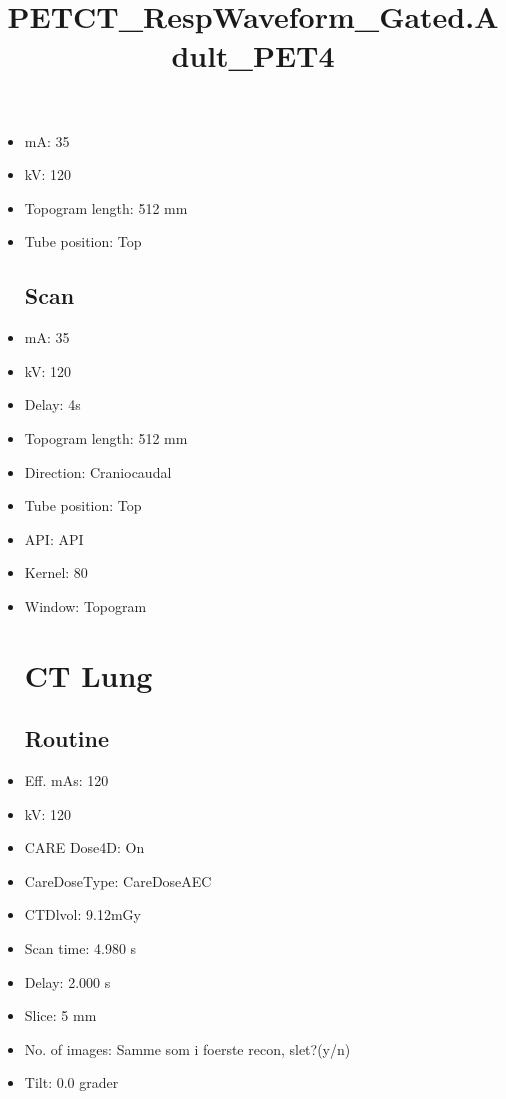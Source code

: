 \documentclass[12pt]{article}
\title{PETCT\_RespWaveform\_Gated.Adult\_PET4}
\begin{document}
\maketitle
\newpage
\tableofcontents
\newpage
{}


\begin{itemize}\section{Topogram}
\subsection{Routine}
\item mA: 35\item kV: 120\item Topogram length: 512 mm\item Tube position: Top
\subsection{Scan}\item mA: 35\item kV: 120\item Delay: 4s\item Topogram length: 512 mm\item Direction: Craniocaudal\item Tube position: Top\item API: API \item Kernel: 80\item Window: Topogram
\section{CT Lung}
\subsection{Routine}
\item Eff. mAs: 120\item kV: 120\item CARE Dose4D: On\item CareDoseType: CareDoseAEC\item CTDlvol: 9.12mGy\item Scan time: 4.980 s\item Delay: 2.000 s\item Slice: 5 mm\item No. of images: Samme som i foerste recon, slet?(y/n)\item Tilt: 0.0 grader

\end{itemize}
\end{document}
